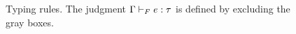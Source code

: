 \begin{figure}
\vspace{-0.00cm}
\caption{Typing rules.
The judgment ${\mathrm{\Gamma}} \vdash_F {e} : {\tau}$ is defined by excluding the gray boxes.}\label{fig:t}\label{fig:typing}
\vspace{-0.00cm}
\end{figure}


